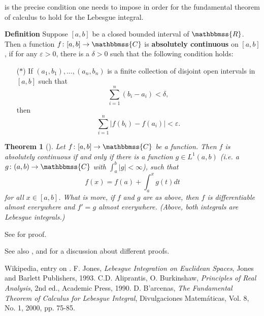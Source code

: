 \documentclass[12pt]{article}
\newcommand{\C}{\mathbbmss{C}}
\newcommand{\R}{\mathbbmss{R}}
\newtheorem{thm}{Theorem}
\begin{document}

 is the precise condition one needs to 
impose in order for the fundamental theorem of calculus 
to hold for the Lebesgue integral.

{\bf Definition}
Suppose $[a,b]$ be a closed bounded interval of $\R$.
Then a function $f\colon [a,b]\to\C$ is 
   {\bf absolutely continuous} on $[a,b]$,
if for any $\varepsilon>0$, there is a $\delta>0$ such that the following
condition holds:
\begin{itemize}
\item[($\ast$)] If $(a_1,b_1), \ldots, (a_n,b_n)$ is a finite
collection of disjoint open intervals in $[a,b]$
such that
$$ 
  \sum_{i=1}^n (b_i-a_i)< \delta,
$$
then
$$ 
   \sum_{i=1}^n |f(b_i)-f(a_i)|< \varepsilon.
$$
\end{itemize}

\begin{thm}[]
Let $f\colon [a,b] \to \C$ be a
function. Then $f$ is absolutely continuous if and only if
there is a function $g\in L^1(a,b)$ (i.e. a $g\colon(a,b)\to \C$ with
$\displaystyle \int_a^b |g|< \infty$), such that
$$ 
   f(x) = f(a) + \int_a^x g(t) dt
$$
for all $x\in[a,b]$.
What is more, if $f$ and $g$ are as above, then $f$ is differentiable
almost everywhere and $f'=g$
almost everywhere. (Above, both integrals are Lebesgue integrals.)
\end{thm}

See \cite{jones,aliprantis} for proof.

See also \cite{wikiabs}, and \cite{barcenas} for a discussion 
about different proofs.

\begin{thebibliography}{9}
 Wikipedia, entry on 
   .
F. Jones, \emph{Lebesgue Integration on Euclidean Spaces},
Jones and Barlett Publishers, 1993.
C.D. Aliprantis, O. Burkinshaw, \emph{Principles of Real Analysis},
2nd ed., Academic Press, 1990.
  D. B'arcenas,
\emph{The Fundamental Theorem of
Calculus for Lebesgue Integral},
Divulgaciones Matem\'aticas, Vol. 8, No. 1, 2000, pp. 75-85.
\end{thebibliography}
\end{document}
